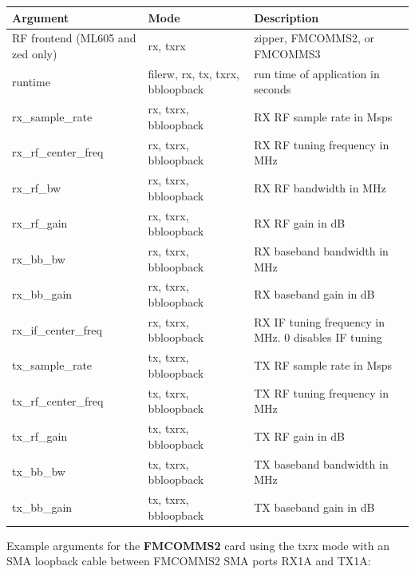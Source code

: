 \begin{tabular}{|l|l|p{6.5cm}|}
\hline
\rowcolor{blue}
Argument & Mode & Description \\
\hline
RF frontend (ML605 and zed only) & rx, txrx & zipper, FMCOMMS2, or FMCOMMS3\\
\hline
runtime & filerw, rx, tx, txrx, bbloopback & run time of application in seconds\\
\hline
rx\_sample\_rate & rx, txrx, bbloopback & RX RF sample rate in Msps\\
\hline
rx\_rf\_center\_freq & rx, txrx, bbloopback & RX RF tuning frequency in MHz\\
\hline
rx\_rf\_bw & rx, txrx, bbloopback & RX RF bandwidth in MHz\\
\hline
rx\_rf\_gain & rx, txrx, bbloopback & RX RF gain in dB\\
\hline
rx\_bb\_bw & rx, txrx, bbloopback & RX baseband bandwidth in MHz\\
\hline
rx\_bb\_gain & rx, txrx, bbloopback & RX baseband gain in dB\\
\hline
rx\_if\_center\_freq & rx, txrx, bbloopback & RX IF tuning frequency in MHz. 0 disables IF tuning\\
\hline
tx\_sample\_rate & tx, txrx, bbloopback & TX RF sample rate in Msps\\
\hline
tx\_rf\_center\_freq & tx, txrx, bbloopback & TX RF tuning frequency in MHz\\
\hline
tx\_rf\_gain & tx, txrx, bbloopback & TX RF gain in dB\\
\hline
tx\_bb\_bw & tx, txrx, bbloopback & TX baseband bandwidth in MHz\\
\hline
tx\_bb\_gain & tx, txrx, bbloopback & TX baseband gain in dB\\
\hline
\end{tabular}\par\medskip
\pagebreak
\noindent Example arguments for the \textbf{FMCOMMS2} card using the txrx mode with an SMA loopback cable between FMCOMMS2 SMA ports RX1A and TX1A:\\
